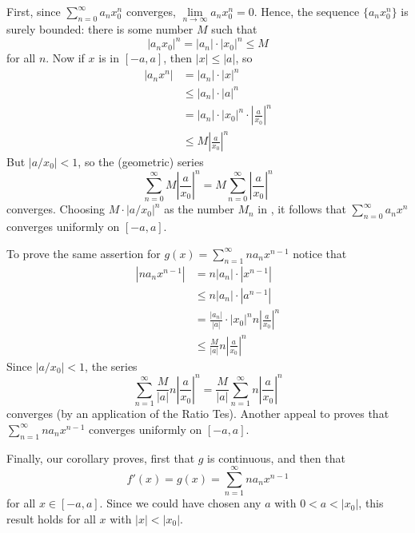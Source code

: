 \documentclass[12pt]{report}
\begin{document}
\begin{proof*}{}{}
    First, since $\sum\limits_{n=0}^{\infty}a_nx_0^n$ converges, $\lim\limits_{n\rightarrow \infty}a_nx_0^n = 0$. Hence, the sequence $\{a_nx_0^n\}$ is surely bounded: there is some number $M$ such that \begin{equation*}
        |a_nx_0|^n = |a_n|\cdot|x_0|^n \leq M
    \end{equation*}
    for all $n$. Now if $x$ is in $[-a,a]$, then $|x| \leq |a|$, so \begin{align*}
        |a_nx^n| &= |a_n|\cdot |x|^n \\
        &\leq |a_n|\cdot|a|^n \\
        &= |a_n|\cdot|x_0|^n\cdot\left|\frac{a}{x_0}\right|^n \\
        &\leq M\left|\frac{a}{x_0}\right|^n
    \end{align*}
    But $|a/x_0| < 1$, so the (geometric) series \begin{equation*}
        \sum\limits_{n=0}^{\infty}M\left|\frac{a}{x_0}\right|^n = M\sum\limits_{n=0}^{\infty}\left|\frac{a}{x_0}\right|^n
    \end{equation*}
    converges. Choosing $M\cdot|a/x_0|^n$ as the number $M_n$ in , it follows that $\sum\limits_{n=0}^{\infty}a_nx^n$ converges uniformly on $[-a,a]$.


    To prove the same assertion for $g(x) = \sum\limits_{n=1}^{\infty}na_nx^{n-1}$ notice that \begin{align*}
        |na_nx^{n-1}| &= n|a_n|\cdot |x^{n-1}| \\
        &\leq n|a_n|\cdot|a^{n-1}| \\
        &= \frac{|a_n|}{|a|}\cdot|x_0|^nn\left|\frac{a}{x_0}\right|^n \\
        &\leq \frac{M}{|a|}n\left|\frac{a}{x_0}\right|^n
    \end{align*}
    Since $|a/x_0| < 1$, the series \begin{equation*}
        \sum\limits_{n=1}^{\infty} \frac{M}{|a|}n\left|\frac{a}{x_0}\right|^n = \frac{M}{|a|}\sum\limits_{n=1}^{\infty}n\left|\frac{a}{x_0}\right|^n
    \end{equation*}
    converges (by an application of the Ratio Tes). Another appeal to  proves that $\sum\limits_{n=1}^{\infty}na_nx^{n-1}$ converges uniformly on $[-a,a]$.

    Finally, our corollary proves, first that $g$ is continuous, and then that \begin{equation*}
        f'(x) = g(x) = \sum\limits_{n=1}^{\infty}na_nx^{n-1}
    \end{equation*}
    for all $x \in [-a,a]$. Since we could have chosen any $a$ with $0 < a < |x_0|$, this result holds for all $x$ with $|x| < |x_0|$.
\end{proof*}
\end{document}
